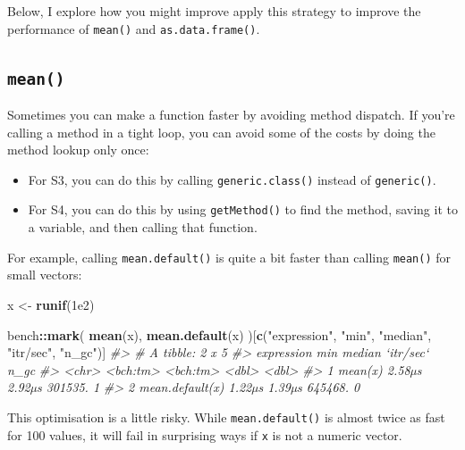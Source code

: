 \documentclass[]{book}
\makeatletter
\newenvironment{Shaded}{\begin{snugshade}}{\end{snugshade}}
\newcommand{\CommentTok}[1]{\textcolor[rgb]{0.37,0.37,0.37}{\textit{#1}}}
\newcommand{\FloatTok}[1]{\textcolor[rgb]{0.06,0.06,0.06}{#1}}
\newcommand{\KeywordTok}[1]{\textcolor[rgb]{0.27,0.27,0.27}{\textbf{#1}}}
\newcommand{\NormalTok}[1]{#1}
\newcommand{\OperatorTok}[1]{\textcolor[rgb]{0.43,0.43,0.43}{\textbf{#1}}}
\newcommand{\StringTok}[1]{\textcolor[rgb]{0.5,0.5,0.5}{#1}}
\newcommand{\indexc}[1]{\index{#1@\texttt{#1}}}
\makeatother
\begin{document}
Below, I explore how you might improve apply this strategy to improve the performance of \texttt{mean()} and \texttt{as.data.frame()}.

\hypertarget{mean}{%
\subsection{\texorpdfstring{\texttt{mean()}}{mean()}}\label{mean}}

\indexc{.Internal()}


Sometimes you can make a function faster by avoiding method dispatch. If you're calling a method in a tight loop, you can avoid some of the costs by doing the method lookup only once:

\begin{itemize}
\item
  For S3, you can do this by calling \texttt{generic.class()} instead of \texttt{generic()}.
\item
  For S4, you can do this by using \texttt{getMethod()} to find the method, saving
  it to a variable, and then calling that function.
\end{itemize}

For example, calling \texttt{mean.default()} is quite a bit faster than calling \texttt{mean()} for small vectors:

\begin{Shaded}
\begin{Highlighting}[]
\NormalTok{x <-}\StringTok{ }\KeywordTok{runif}\NormalTok{(}\FloatTok{1e2}\NormalTok{)}

\NormalTok{bench}\OperatorTok{::}\KeywordTok{mark}\NormalTok{(}
  \KeywordTok{mean}\NormalTok{(x),}
  \KeywordTok{mean.default}\NormalTok{(x)}
\NormalTok{)[}\KeywordTok{c}\NormalTok{(}\StringTok{"expression"}\NormalTok{, }\StringTok{"min"}\NormalTok{, }\StringTok{"median"}\NormalTok{, }\StringTok{"itr/sec"}\NormalTok{, }\StringTok{"n_gc"}\NormalTok{)]}
\CommentTok{#> # A tibble: 2 x 5}
\CommentTok{#>   expression           min   median `itr/sec`  n_gc}
\CommentTok{#>   <chr>           <bch:tm> <bch:tm>     <dbl> <dbl>}
\CommentTok{#> 1 mean(x)           2.58µs   2.92µs   301535.     1}
\CommentTok{#> 2 mean.default(x)   1.22µs   1.39µs   645468.     0}
\end{Highlighting}
\end{Shaded}

This optimisation is a little risky. While \texttt{mean.default()} is almost twice as fast for 100 values, it will fail in surprising ways if \texttt{x} is not a numeric vector.
\end{document}
